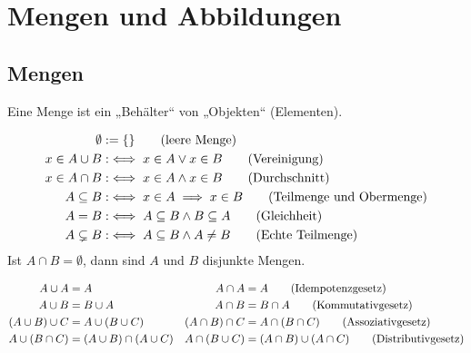 \chapter{Mengen und Abbildungen}

\section{Mengen}

Eine Menge ist ein „Behälter“ von „Objekten“ (Elementen).

\begin{definition}
  \begin{align*}
    \emptyset &:= \{\} \tag{leere Menge\index{Menge!Leere Menge}} \\
    x \in A \cup B &:\iff x \in A \vee x \in B \tag{Vereinigung\index{Menge!Vereinigung}}\\
    x \in A \cap B &:\iff x \in A \wedge x \in B \tag{Durchschnitt\index{Menge!Durchschnitt}}\\
    A \subseteq B &:\iff x \in A \implies x \in B \tag{Teilmenge und Obermenge\index{Menge!Teilmenge}\index{Menge!Obermenge}}\\
    A = B &:\iff A \subseteq B \wedge B \subseteq A \tag{Gleichheit\index{Menge!Gleichheit}} \\
    A \subsetneq B &:\iff A \subseteq B \wedge A \ne B \tag{Echte Teilmenge\index{Menge!Echte Teilmenge}}
  \end{align*}
  Ist $A \cap B = \emptyset$, dann sind $A$ und $B$ disjunkte Mengen.
  \index[sym]{$\emptyset$}\index[sym]{$\cup$}\index[sym]{$\cap$}\index[sym]{$\subseteq$}\index[sym]{$\subsetneq$}\index[sym]{$=$}
\end{definition}
\begin{lemma}
  \begin{align*}
    A \cup A &= A & A \cap A &= A \tag{Idempotenzgesetz\index{Menge!Idempotenzgesetz}} \\
    A \cup B &= B \cup A & A \cap B &= B \cap A \tag{Kommutativgesetz\index{Menge!Kommutativgesetz}} \\
    (A \cup B) \cup C &= A \cup (B \cup C) & (A \cap B) \cap C &= A \cap (B \cap C) \tag{Assoziativgesetz\index{Menge!Assoziativgesetz}} \\
    A \cup (B \cap C) &= (A \cup B) \cap (A \cup C) & A \cap (B \cup C) &= (A \cap B) \cup (A \cap C) \tag{Distributivgesetz\index{Menge!Distributivgesetz}}
  \end{align*}
\end{lemma}

